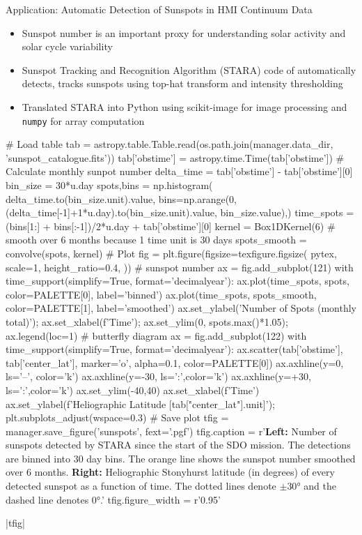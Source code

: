 \begin{block}{Application: Automatic Detection of Sunspots in HMI Continuum Data}

\begin{itemize}
    \item Sunspot number is an important proxy for understanding solar activity and solar cycle variability
    \item Sunspot Tracking and Recognition Algorithm (STARA) code of \citet{watson_modelling_2009,watson_evolution_2011} automatically detects, tracks sunspots using top-hat transform and intensity thresholding
    \item Translated STARA into Python using scikit-image \citep{van_der_walt_scikit-image_2014} for image processing and \texttt{numpy} \citep{van_der_walt_numpy_2011} for array computation

\end{itemize}

\begin{pycode}[manager]
# Load table
tab = astropy.table.Table.read(os.path.join(manager.data_dir, 'sunspot_catalogue.fits'))
tab['obstime'] = astropy.time.Time(tab['obstime'])
# Calculate monthly sunpot number
delta_time = tab['obstime'] - tab['obstime'][0]
bin_size = 30*u.day
spots,bins = np.histogram(
    delta_time.to(bin_size.unit).value,
    bins=np.arange(0,(delta_time[-1]+1*u.day).to(bin_size.unit).value, bin_size.value),)
time_spots = (bins[1:] + bins[:-1])/2*u.day + tab['obstime'][0]
kernel = Box1DKernel(6)  # smooth over 6 months because 1 time unit is 30 days
spots_smooth = convolve(spots, kernel)
# Plot
fig = plt.figure(figsize=texfigure.figsize(
    pytex,
    scale=1,
    height_ratio=0.4,
))
# sunspot number
ax = fig.add_subplot(121)
with time_support(simplify=True, format='decimalyear'):
    ax.plot(time_spots, spots, color=PALETTE[0], label='binned')
    ax.plot(time_spots, spots_smooth, color=PALETTE[1], label='smoothed')
ax.set_ylabel('Number of Spots (monthly total)');
ax.set_xlabel(f'Time');
ax.set_ylim(0, spots.max()*1.05);
ax.legend(loc=1)
# butterfly diagram
ax = fig.add_subplot(122)
with time_support(simplify=True, format='decimalyear'):
    ax.scatter(tab['obstime'],
               tab['center_lat'],
    marker='o', alpha=0.1, color=PALETTE[0])
ax.axhline(y=0, ls='--', color='k')
ax.axhline(y=-30, ls=':',color='k')
ax.axhline(y=+30, ls=':',color='k')
ax.set_ylim(-40,40)
ax.set_xlabel(f'Time')
ax.set_ylabel(f'Heliographic Latitude [{tab["center_lat"].unit}]');
plt.subplots_adjust(wspace=0.3)
# Save plot
tfig = manager.save_figure('sunspots', fext='.pgf')
tfig.caption = r'\textbf{Left:} Number of sunspots detected by STARA since the start of the SDO mission. The detections are binned into 30 day bins. The orange line shows the sunspot number smoothed over 6 months. \textbf{Right:} Heliographic Stonyhurst latitude (in degrees) of every detected sunspot as a function of time. The dotted lines denote $\pm\ang{30}$ and the dashed line denotes \ang{0}.'
tfig.figure_width = r'0.95\columnwidth'
\end{pycode}
\py[manager]|tfig|


\end{block}
